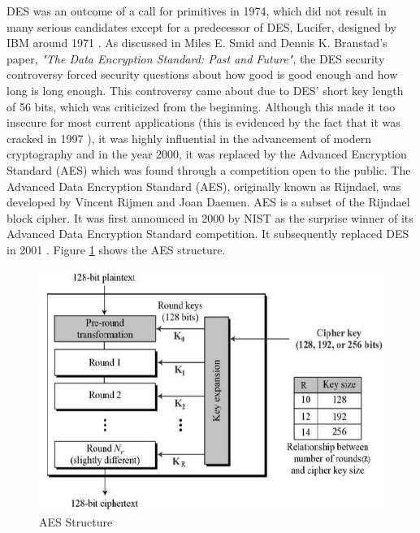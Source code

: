 \documentclass[journal]{IEEEtran}
\begin{document}
DES was an outcome of a call for primitives in 1974, which did not result in many serious candidates except for a predecessor of DES, Lucifer, designed by IBM around 1971 \cite{des}. As discussed in Miles E. Smid and Dennis K. Branstad's paper, \textit{"The Data Encryption Standard: Past and Future"}, the DES security controversy \cite{des_past&future} forced security questions about how good is good enough and how long is long enough. This controversy came about due to DES' short key length of 56 bits, which was criticized from the beginning. Although this made it too insecure for most current applications (this is evidenced by the fact that it was cracked in 1997 \cite{des_cracked}), it was highly influential in the advancement of modern cryptography \cite{des_overview} and in the year 2000, it was replaced by the Advanced Encryption Standard (AES) which was found through a competition open to the public.
\newline\newline
The Advanced Data Encryption Standard (AES), originally known as Rijndael, was developed by Vincent Rijmen and Joan Daemen. AES is a subset of the Rijndael block cipher. It was first announced in 2000 by NIST as the surprise winner \cite{aes} of its Advanced Data Encryption Standard competition. It subsequently replaced DES in 2001 \cite{encryption_study}. Figure \ref{fig:aes} shows the AES structure.

\newline
\begin{figure}[!h]
    \centering
    \includegraphics[scale=.4]{aes_structure}
    \caption{AES Structure}
    \label{fig:aes}
\end{figure}
\end{document}
